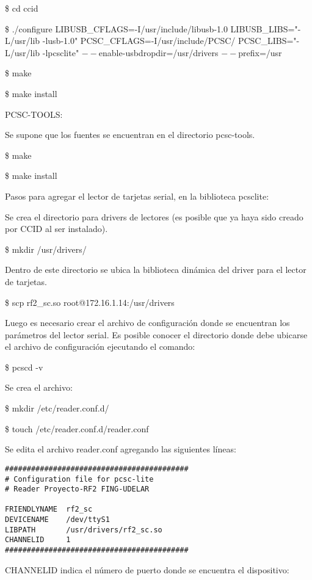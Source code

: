 \bigskip
\centerline{\$ cd ccid}

\$ ./configure LIBUSB\_CFLAGS=-I/usr/include/libusb-1.0 LIBUSB\_LIBS="-L/usr/lib -lusb-1.0" PCSC\_CFLAGS=-I/usr/include/PCSC/ PCSC\_LIBS="-L/usr/lib -lpcsclite" $--$enable-usbdropdir=/usr/drivers $--$prefix=/usr

\centerline{\$ make}

\centerline{\$ make install}

\bigskip
PCSC-TOOLS:

\bigskip
Se supone que los fuentes se encuentran en el directorio pcsc-tools.

\bigskip
\centerline{\$ make}

\centerline{\$ make install}

\bigskip
\bigskip
Pasos para agregar el lector de tarjetas serial, en la biblioteca pcsclite:

\bigskip
Se crea el directorio para drivers de lectores (es posible que ya haya sido creado por CCID al ser instalado). 

\bigskip
\centerline{\$ mkdir /usr/drivers/}

Dentro de este directorio se ubica la biblioteca dinámica del driver para el lector de tarjetas. 

\bigskip	 
\centerline{\$ scp rf2\_sc.so root@172.16.1.14:/usr/drivers}

\bigskip
Luego es necesario crear el archivo de configuración donde se encuentran los parámetros del lector serial. Es posible conocer el directorio donde debe ubicarse el archivo de configuración ejecutando el comando: 

\bigskip
\centerline{\$ pcscd -v}

\bigskip
Se crea el archivo: 

\bigskip
\$ mkdir /etc/reader.conf.d/ 

\$ touch /etc/reader.conf.d/reader.conf 

\bigskip
Se edita el archivo reader.conf agregando las siguientes líneas: 

\begin{verbatim}
##########################################
# Configuration file for pcsc-lite 
# Reader Proyecto-RF2 FING-UDELAR 

FRIENDLYNAME  rf2_sc 
DEVICENAME    /dev/ttyS1 
LIBPATH       /usr/drivers/rf2_sc.so 
CHANNELID     1 
##########################################
\end{verbatim}

CHANNELID indica el número de puerto donde se encuentra el dispositivo: 

